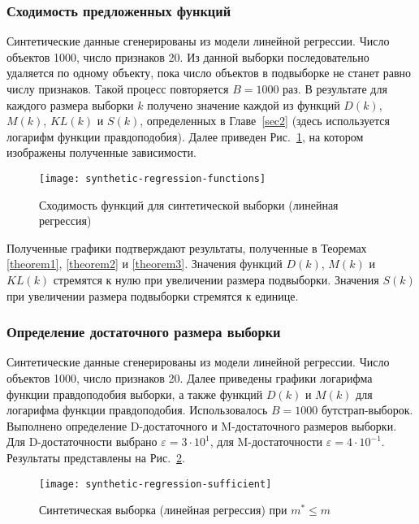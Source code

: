 \subsubsection{Сходимость предложенных функций}

Синтетические данные сгенерированы из модели линейной регрессии. Число объектов 1000, число признаков 20. Из данной выборки последовательно удаляется по одному объекту, пока число объектов в подвыборке не станет равно числу признаков. Такой процесс повторяется $B=1000$ раз. В результате для каждого размера выборки $k$ получено значение каждой из функций $D(k)$, $M(k)$, $KL(k)$ и $S(k)$, определенных в Главе~\ref{sec2} (здесь используется логарифм функции правдоподобия). Далее приведен Рис.~\ref{synthetic-regression-functions}, на котором изображены полученные зависимости.

\begin{figure}[h!]
    \centering
    \texttt{[image: synthetic-regression-functions]}
    \caption{Сходимость функций для синтетической выборки (линейная регрессия)}
    \label{synthetic-regression-functions}
\end{figure}

Полученные графики подтверждают результаты, полученные в Теоремах \ref{theorem1}, \ref{theorem2} и \ref{theorem3}. Значения функций $D(k)$, $M(k)$ и $KL(k)$ стремятся к нулю при увеличении размера подвыборки. Значения $S(k)$ при увеличении размера подвыборки стремятся к единице.

\subsubsection{Определение достаточного размера выборки}

Синтетические данные сгенерированы из модели линейной регрессии. Число объектов 1000, число признаков 20. Далее приведены графики логарифма функции правдоподобия выборки, а также функций $D(k)$ и $M(k)$ для логарифма функции правдоподобия. Использовалось $B=1000$ бутстрап-выборок. Выполнено определение D-достаточного и M-достаточного размеров выборки. Для D-достаточности выбрано $\varepsilon = 3 \cdot 10^{1}$, для M-достаточности $\varepsilon = 4 \cdot 10^{-1}$. Результаты представлены на Рис.~\ref{synthetic-regression-sufficient}. 

\begin{figure}[h!]
    \centering
    \texttt{[image: synthetic-regression-sufficient]}
    \caption{Синтетическая выборка (линейная регрессия) при $m^* \leqslant m$}
    \label{synthetic-regression-sufficient}
\end{figure}

